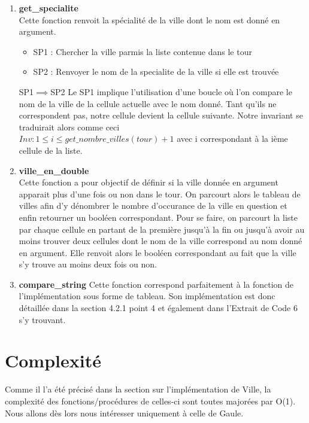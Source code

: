 \documentclass[a4paper, 11pt, oneside]{article}
\begin{document}
\begin{enumerate}
    \item \textbf{get\_specialite}
    \\Cette fonction renvoit la spécialité de la ville dont le nom est donné en argument.
    \begin{itemize}
        \item SP1 : Chercher la ville parmis la liste contenue dans le tour
        \item SP2 : Renvoyer le nom de la specialite de la ville si elle est trouvée
    \end{itemize}
    SP1$\implies$SP2
    Le SP1 implique l'utilisation d'une boucle où l'on compare le nom de la ville de la cellule 
    actuelle avec le nom donné. Tant qu'ils ne correspondent pas, notre cellule devient la cellule 
    suivante. Notre invariant se traduirait alors comme ceci
    \\$Inv : 1\leq i \leq get\_nombre\_villes(tour)+1$ avec i correspondant à la ième cellule de la liste.
    \item \textbf{ville\_en\_double}
    \\Cette fonction a pour objectif de définir si la ville donnée en argument apparait plus d’une
    fois ou non dans le tour. On parcourt alors le tableau de villes afin d’y dénombrer le nombre
    d’occurance de la ville en question et enfin retourner un booléen correspondant.
    Pour se faire, on parcourt la liste par chaque cellule en partant de la première jusqu'à la fin ou jusqu'à
    avoir au moins trouver deux cellules dont le nom de la ville correspond au nom donné en argument.
    Elle renvoit alors le booléen correspondant au fait que la ville s'y trouve au moins deux fois ou non.
    \item \textbf{compare\_string}
    Cette fonction correspond parfaitement à la fonction de l'implémentation sous forme de tableau. Son 
    implémentation est donc détaillée dans la section 4.2.1 point 4 et également dans l'Extrait 
    de Code 6 s'y trouvant.
\end{enumerate}

\section{\textbf{Complexité}}
Comme il l'a été précisé dans la section sur l'implémentation de Ville, la complexité des fonctions/procédures 
de celles-ci sont toutes majorées par O(1). Nous allons dès lors nous intéresser uniquement à celle 
de Gaule.
\end{document}

